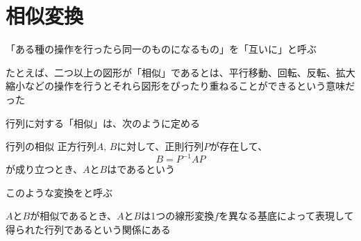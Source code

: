 \documentclass[../../../topic_linear-algebra]{subfiles}
\begin{document}
\sectionline
\section{相似変換}

「ある種の操作を行ったら同一のものになるもの」を「互いに」と呼ぶ

\br

たとえば、二つ以上の図形が「相似」であるとは、平行移動、回転、反転、拡大縮小などの操作を行うとそれら図形をぴったり重ねることができるという意味だった

\br

行列に対する「相似」は、次のように定める

\begin{definition}{行列の相似}\label{def:similar-matrices}
  正方行列$A,\,B$に対して、正則行列$P$が存在して、
  \begin{equation*}
    B = P^{-1} A P
  \end{equation*}
  が成り立つとき、$A$と$B$はであるという
\end{definition}

このような変換をと呼ぶ

\br

$A$と$B$が相似であるとき、$A$と$B$は1つの線形変換$f$を異なる基底によって表現して得られた行列であるという関係にある
\end{document}
